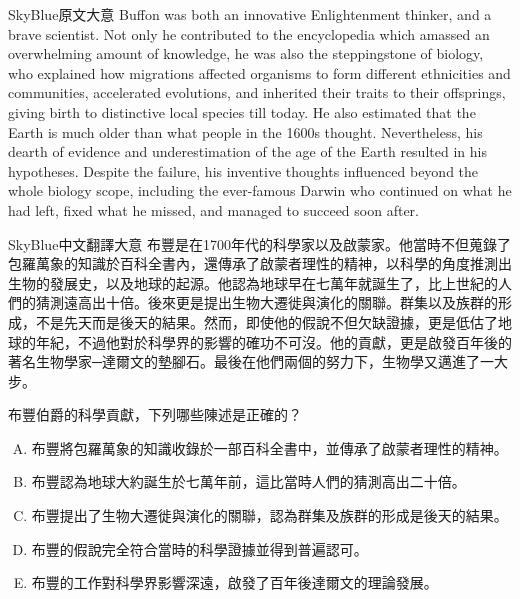 \documentclass[
	a4paper,
	fontsize=11pt,
	twoside=true,
	numbers=noenddot,
]{article}
\begin{document}

\begin{large}
    \begin{boxpar}{SkyBlue}{原文大意}
Buffon was both an innovative Enlightenment thinker, and a brave
scientist. Not only he contributed to the encyclopedia which amassed an
overwhelming amount of knowledge, he was also the steppingstone of
biology, who explained how migrations affected organisms to form
different ethnicities and communities, accelerated evolutions, and
inherited their traits to their offsprings, giving birth to distinctive
local species till today. He also estimated that the Earth is much older
than what people in the 1600s thought. Nevertheless, his dearth of
evidence and underestimation of the age of the Earth resulted in his
hypotheses. Despite the failure, his inventive thoughts influenced
beyond the whole biology scope, including the ever-famous Darwin who
continued on what he had left, fixed what he missed, and managed to
succeed soon after.
\end{boxpar}
    \begin{boxpar}{SkyBlue}{中文翻譯大意}
布豐是在1700年代的科學家以及啟蒙家。他當時不但蒐錄了包羅萬象的知識於百科全書內，還傳承了啟蒙者理性的精神，以科學的角度推測出生物的發展史，以及地球的起源。他認為地球早在七萬年就誕生了，比上世紀的人們的猜測遠高出十倍。後來更是提出生物大遷徙與演化的關聯。群集以及族群的形成，不是先天而是後天的結果。然而，即使他的假說不但欠缺證據，更是低估了地球的年紀，不過他對於科學界的影響的確功不可沒。他的貢獻，更是啟發百年後的著名生物學家─達爾文的墊腳石。最後在他們兩個的努力下，生物學又邁進了一大步。
\end{boxpar}
\begin{tcolorbox}[title=多選題,colback=SkyBlue!5!white,colframe=SkyBlue!75!black]

布豐伯爵的科學貢獻，下列哪些陳述是正確的？\\

\begin{enumerate}[(A)]
    \item 布豐將包羅萬象的知識收錄於一部百科全書中，並傳承了啟蒙者理性的精神。
    \item 布豐認為地球大約誕生於七萬年前，這比當時人們的猜測高出二十倍。
    \item 布豐提出了生物大遷徙與演化的關聯，認為群集及族群的形成是後天的結果。
    \item 布豐的假說完全符合當時的科學證據並得到普遍認可。
    \item 布豐的工作對科學界影響深遠，啟發了百年後達爾文的理論發展。
\end{enumerate}


\end{tcolorbox}
\end{large}
\end{document}
